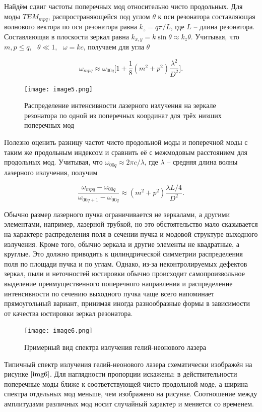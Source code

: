 \documentclass[a4paper,12pt]{article} %
\begin{document}
Найдём сдвиг частоты поперечных мод относительно чисто продольных. Для моды $TEM_{mpq}$, распространяющейся под углом $\theta$ к оси резонатора составляющая волнового вектора по оси резонатора равна $k_z=q\pi/L$, где $L$ -- длина резонатора. Составляющая в плоскости зеркал равна $k_{x,y}=k\sin{\theta}\approx k_z\theta$. Учитывая, что $m,p\leq q, \text{ }\theta\ll1, \text{ }\omega=kc$, получаем для угла $\theta$

\[ \omega_{mpq}\approx\omega_{00q}\Big[1+\frac{1}{8}(m^2+p^2)\frac{\lambda^2}{D^2}\Big]. \]

\begin{figure}
    \texttt{[image: image5.png]}
    \caption{Распределение интенсивности лазерного излучения на зеркале резонатора по одной из поперечных координат для трёх низших поперечных мод}
    \label{img5}
\end{figure}

Полезно оценить разницу частот чисто продольной моды и поперечной моды с таким же продольным индексом и сравнить её с межмодовым расстоянием для продольных мод. Учитывая, что $\omega_{00q}\approx2\pi c/\lambda$, где $\lambda$ -- средняя длина волны лазерного излучения, получим

\[ \frac{\omega_{mpq}-\omega_{00q}}{\omega_{00q+1}-\omega_{00q}}\approx(m^2+p^2)\frac{\lambda L/4}{D^2}. \]

Обычно размер лазерного пучка ограничивается не зеркалами, а другими элементами, например, лазерной трубкой, но это обстоятельство мало сказывается на характере распределения поля в сечении пучка и модовой структуре выходного излучения. Кроме того, обычно зеркала и другие элементы не квадратные, а круглые. Это должно приводить к цилиндрической симметрии распределения поля по площади пучка и по углам. Однако, из-за неконтролируемых дефектов зеркал, пыли и неточностей юстировки обычно происходит самопроизвольное выделение преимущественного поперечного направления и распределение интенсивности по сечению выходного пучка чаще всего напоминает прямоугольный вариант, принимая иногда разнообразные формы в зависимости от качества юстировки зеркал резонатора.

\begin{figure}
    \texttt{[image: image6.png]}
    \caption{Примерный вид спектра излучения гелий-неонового лазера}
    \label{img6}
\end{figure}

Типичный спектр излучения гелий-неонового лазера схематически изображён на рисунке $\ref{img6}$. Для наглядности пропорции искажены: в действительности поперечные моды ближе к соответствующей чисто продольной моде, а ширина спектра отдельных мод меньше, чем изображено на рисунке. Соотношение между амплитудами различных мод носит случайный характер и меняется со временем.
\end{document}
